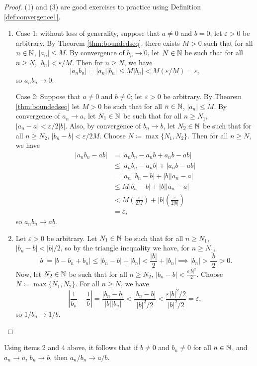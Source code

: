 \documentclass[../analysis1.tex]{subfiles}
\begin{document}
\begin{proof}
    (1) and (3) are good exercises to practice using Definition \ref{def:convergence1}.
    \begin{enumerate}
        \item[2.] Case 1: without loss of generality, suppose that $a\ne 0$ and $b=0$; let $\varepsilon>0$ be arbitrary. By Theorem \ref{thm:boundedseq}, there exists $M>0$ such that for all $n\in\mathbb{N}$, $|a_n|\le M$.
        By convergence of $b_n\to 0$, let $N\in\mathbb{N}$ be such that for all $n\ge N$, $|b_n|<\varepsilon/M$. Then for $n\ge N$, we have $$|a_nb_n|=|a_n||b_n|\le M|b_n|<M(\varepsilon/M)=\varepsilon,$$
        so $a_nb_n\to 0$.\par
        Case 2: Suppose that $a\ne 0$ and $b\ne 0$; let $\varepsilon>0$ be arbitrary. By Theorem \ref{thm:boundedseq} let $M>0$ be such that for all $n\in\mathbb{N}$, $|a_n|\le M$.
        By convergence of $a_n\to a$, let $N_1\in\mathbb{N}$ be such that for all $n\ge N_1$, $|a_n-a|<\varepsilon/2|b|$.
        Also, by convergence of $b_n\to b$, let $N_2\in\mathbb{N}$ be such that for all $n\ge N_2$, $|b_n-b|<\varepsilon/2M$.
        Choose $N\coloneqq\max\{N_1,N_2\}$. Then for all $n\ge N$, we have
        \begin{align*}
            |a_nb_n-ab|&=|a_nb_n-a_nb+a_nb-ab|\\
            &\le |a_nb_n-a_nb|+|a_nb-ab|\\
            &=|a_n||b_n-b|+|b||a_n-a|\\
            &\le M|b_n-b|+|b||a_n-a|\\
            &< M\left(\frac{\varepsilon}{2M}\right)+|b|\left(\frac{\varepsilon}{2|b|}\right)\\
            &=\varepsilon,
        \end{align*}
        so $a_nb_n\to ab$.
        \item[4.] Let $\varepsilon>0$ be arbitrary. Let $N_1\in\mathbb{N}$ be such that for all $n\ge N_1$, $|b_n-b|<|b|/2$, so by the triangle inequality we have, for $n\ge N_1$,
        $$|b|=|b-b_n+b_n|\le |b_n-b|+|b_n|<\frac{|b|}{2}+|b_n|\implies |b_n|>\frac{|b|}{2}>0.$$
        Now, let $N_2\in\mathbb{N}$ be such that for all $n\ge N_2$, $|b_n-b|<\frac{\varepsilon|b|^2}{2}$. Choose $N\coloneqq\max\{N_1,N_2\}$. For all $n\ge N$, we have $$\left|\frac{1}{b_n}-\frac{1}{b}\right|=\frac{|b_n-b|}{|b||b_n|}<\frac{|b_n-b|}{|b|^2/2}<\frac{\varepsilon|b|^2/2}{|b|^2/2}=\varepsilon,$$
        so $1/b_n\to 1/b$.\qedhere
    \end{enumerate}
\end{proof}
\begin{remark}
    Using items 2 and 4 above, it follows that if $b\ne 0$ and $b_n\ne 0$ for all $n\in\mathbb{N}$, and $a_n\to a$, $b_n\to b$, then $a_n/b_n\to a/b$.
\end{remark}
\end{document}
